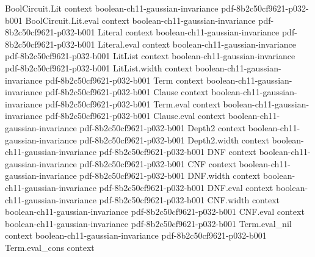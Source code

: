 \begin{lemma}
\label{BooleanAnalysis.GaussianSpace.hermiteCoeff_sq_summable}
\leanok
{}
\proofstep
  {BoolCircuit.Lit}
  {context}
  {boolean-ch11-gaussian-invariance}
  {pdf-8b2c50cf9621-p032-b001}
\proofstep
  {BoolCircuit.Lit.eval}
  {context}
  {boolean-ch11-gaussian-invariance}
  {pdf-8b2c50cf9621-p032-b001}
\proofstep
  {Literal}
  {context}
  {boolean-ch11-gaussian-invariance}
  {pdf-8b2c50cf9621-p032-b001}
\proofstep
  {Literal.eval}
  {context}
  {boolean-ch11-gaussian-invariance}
  {pdf-8b2c50cf9621-p032-b001}
\proofstep
  {LitList}
  {context}
  {boolean-ch11-gaussian-invariance}
  {pdf-8b2c50cf9621-p032-b001}
\proofstep
  {LitList.width}
  {context}
  {boolean-ch11-gaussian-invariance}
  {pdf-8b2c50cf9621-p032-b001}
\proofstep
  {Term}
  {context}
  {boolean-ch11-gaussian-invariance}
  {pdf-8b2c50cf9621-p032-b001}
\proofstep
  {Clause}
  {context}
  {boolean-ch11-gaussian-invariance}
  {pdf-8b2c50cf9621-p032-b001}
\proofstep
  {Term.eval}
  {context}
  {boolean-ch11-gaussian-invariance}
  {pdf-8b2c50cf9621-p032-b001}
\proofstep
  {Clause.eval}
  {context}
  {boolean-ch11-gaussian-invariance}
  {pdf-8b2c50cf9621-p032-b001}
\proofstep
  {Depth2}
  {context}
  {boolean-ch11-gaussian-invariance}
  {pdf-8b2c50cf9621-p032-b001}
\proofstep
  {Depth2.width}
  {context}
  {boolean-ch11-gaussian-invariance}
  {pdf-8b2c50cf9621-p032-b001}
\proofstep
  {DNF}
  {context}
  {boolean-ch11-gaussian-invariance}
  {pdf-8b2c50cf9621-p032-b001}
\proofstep
  {CNF}
  {context}
  {boolean-ch11-gaussian-invariance}
  {pdf-8b2c50cf9621-p032-b001}
\proofstep
  {DNF.width}
  {context}
  {boolean-ch11-gaussian-invariance}
  {pdf-8b2c50cf9621-p032-b001}
\proofstep
  {DNF.eval}
  {context}
  {boolean-ch11-gaussian-invariance}
  {pdf-8b2c50cf9621-p032-b001}
\proofstep
  {CNF.width}
  {context}
  {boolean-ch11-gaussian-invariance}
  {pdf-8b2c50cf9621-p032-b001}
\proofstep
  {CNF.eval}
  {context}
  {boolean-ch11-gaussian-invariance}
  {pdf-8b2c50cf9621-p032-b001}
\proofstep
  {Term.eval_nil}
  {context}
  {boolean-ch11-gaussian-invariance}
  {pdf-8b2c50cf9621-p032-b001}
\proofstep
  {Term.eval_cons}
  {context}

\end{lemma}
